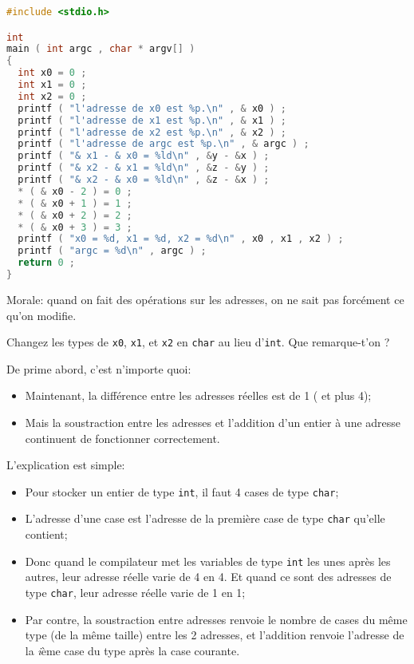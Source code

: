 \begin{solution}
  \begin{lstlisting}[language=C]
#include <stdio.h>

int
main ( int argc , char * argv[] )
{
  int x0 = 0 ;
  int x1 = 0 ;
  int x2 = 0 ;
  printf ( "l'adresse de x0 est %p.\n" , & x0 ) ;
  printf ( "l'adresse de x1 est %p.\n" , & x1 ) ;
  printf ( "l'adresse de x2 est %p.\n" , & x2 ) ;
  printf ( "l'adresse de argc est %p.\n" , & argc ) ;
  printf ( "& x1 - & x0 = %ld\n" , &y - &x ) ;
  printf ( "& x2 - & x1 = %ld\n" , &z - &y ) ;
  printf ( "& x2 - & x0 = %ld\n" , &z - &x ) ;
  * ( & x0 - 2 ) = 0 ;
  * ( & x0 + 1 ) = 1 ;
  * ( & x0 + 2 ) = 2 ;
  * ( & x0 + 3 ) = 3 ;
  printf ( "x0 = %d, x1 = %d, x2 = %d\n" , x0 , x1 , x2 ) ;
  printf ( "argc = %d\n" , argc ) ;
  return 0 ;
}    
  \end{lstlisting}
  Morale: quand on fait des opérations sur les adresses, on ne sait
  pas forcément ce qu'on modifie. 
\end{solution}

\question Changez les types de \texttt{x0}, \texttt{x1}, et
\texttt{x2} en \texttt{char} au lieu d'\texttt{int}. Que remarque-t'on
?

\begin{solution}
  De prime abord, c'est n'importe quoi:
  \begin{itemize}
  \item Maintenant, la différence entre les adresses réelles est de 1 ( et plus 4);
  \item Mais la soustraction entre les adresses et l'addition d'un entier à une adresse
    continuent de fonctionner correctement.
  \end{itemize}
  L'explication est simple:
  \begin{itemize}
  \item Pour stocker un entier de type \texttt{int}, il faut 4 cases
    de type \texttt{char};
  \item L'adresse d'une case est l'adresse de la première case de type
    \texttt{char} qu'elle contient;
  \item Donc quand le compilateur met les variables de type
    \texttt{int} les unes après les autres, leur adresse réelle varie
    de 4 en 4. Et quand ce sont des adresses de type \texttt{char},
    leur adresse réelle varie de 1 en 1;
  \item Par contre, la soustraction entre adresses renvoie le nombre
    de cases du même type (de la même taille) entre les 2 adresses, et
    l'addition renvoie l'adresse de la \textit{i}ème case du type
    après la case courante.
  \end{itemize}
\end{solution}

